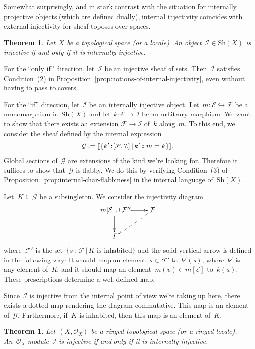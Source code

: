 \documentclass[10pt,reqno,a4paper]{amsbook}
\makeatletter
\theoremstyle{definition}
\theoremstyle{plain}
\newtheorem{thm}[defn]{Theorem}
\theoremstyle{remark}
\newcommand{\E}{\mathcal{E}}
\newcommand{\F}{\mathcal{F}}
\renewcommand{\G}{\mathcal{G}}
\renewcommand{\O}{\mathcal{O}}
\newcommand{\I}{\mathcal{I}}
\newcommand{\Sh}{\mathrm{Sh}}
\newcommand{\?}{\,{:}\,}
\renewcommand{\_}{\mathpunct{.}\,}
\newcommand{\brak}[1]{{\llbracket{#1}\rrbracket}}
\newcommand{\defeq}{\vcentcolon=}
\renewenvironment{proof}[1][\proofname]{\par
  \pushQED{\qed}%
  \normalfont \topsep6\p@\@plus6\p@\relax
  \trivlist
  \item[\hskip\labelsep
        \itshape
    #1\@addpunct{.}]\ignorespaces
}{%
  \popQED\endtrivlist\@endpefalse
}
\makeatother
\begin{document}
Somewhat surprisingly, and in stark contrast with the situation for internally
projective objects (which are defined dually), internal injectivity coincides
with external injectivity for sheaf toposes over spaces.

\begin{thm}\label{thm:char-injectivity}
Let~$X$ be a topological space (or a locale). An object~$\I \in \Sh(X)$ is
injective if and only if it is internally injective.
\end{thm}

\begin{proof}For the ``only if'' direction, let~$\I$ be an injective sheaf of
sets. Then~$\I$ satisfies Condition~(2) in
Proposition~\ref{prop:notions-of-internal-injectivity}, even without having to
pass to covers.

For the ``if'' direction, let~$\I$ be an internally injective object. Let~$m :
\E \hookrightarrow \F$ be a monomorphism in~$\Sh(X)$ and let~$k : \E \to \I$ be an arbitrary
morphism. We want to show that there exists an extension $\F \to \I$ of~$k$
along~$m$. To this end, we consider the sheaf defined by the internal expression
\[ \G \defeq \brak{\{ k' \? [\F,\I] \,|\, k' \circ m = k \}}. \]
Global sections of~$\G$ are extensions of the kind we're looking for.
Therefore it suffices to show that~$\G$ is flabby. We do this by verifying
Condition~(3) of Proposition~\ref{prop:internal-char-flabbiness} in the internal
language of~$\Sh(X)$.

Let~$K \subseteq \G$ be a subsingleton. We consider the injectivity diagram
\[ \xymatrix{
  m[\E] \cup \F' \ar@{^{(}->}[r]\ar[d] & \F \ar@{-->}[ld] \\
  \I
} \]
where~$\F'$ is the set~$\{ s \? \F \,|\, \text{$K$ is inhabited} \}$ and the solid
vertical arrow is defined in the following way: It should map an element~$s \in
\F'$ to~$k'(s)$, where~$k'$ is any element of~$K$; and it should map an
element~$m(u) \in m[\E]$ to~$k(u)$. These prescriptions determine a well-defined
map.

Since~$\I$ is injective from the internal point of view we're taking up here,
there exists a dotted map rendering the diagram commutative. This map is an
element of~$\G$. Furthermore, if~$K$ is inhabited, then this map is an element of~$K$.
\end{proof}

\begin{thm}\label{thm:char-injectivity-modules}
Let~$(X,\O_X)$ be a ringed topological space (or a ringed locale).
An~$\O_X$-module~$\I$ is injective if and only if it is internally injective.
\end{thm}
\end{document}
